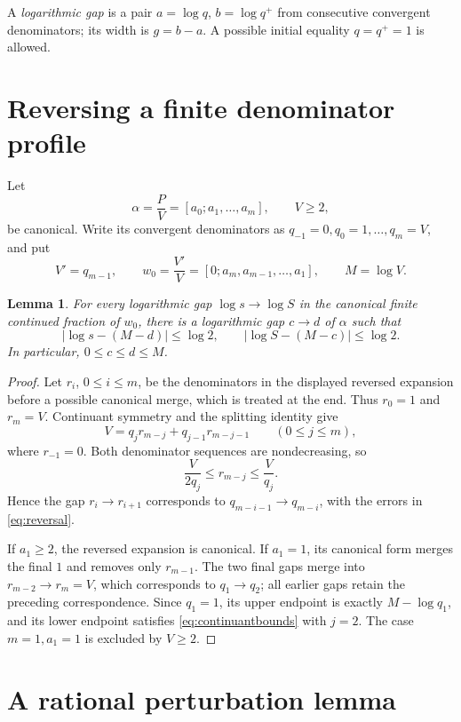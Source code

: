 \documentclass{amsart}
\newtheorem{lemma}{Lemma}[section]
\numberwithin{equation}{section}
\begin{document}
A \emph{logarithmic gap} is a pair
$a=\log q$, $b=\log q^+$ from consecutive convergent denominators;
its width is $g=b-a$. A possible initial equality $q=q^+=1$ is
allowed.

\section{Reversing a finite denominator profile}

Let
\[
\alpha=\frac PV=[a_0;a_1,\ldots,a_m],\qquad V\ge2,
\]
be canonical. Write its convergent denominators as
$q_{-1}=0,q_0=1,\ldots,q_m=V$, and put
\[
V'=q_{m-1},\qquad
w_0=\frac{V'}V=[0;a_m,a_{m-1},\ldots,a_1],\qquad M=\log V.
\]

\begin{lemma}\label{lem:reversal}
For every logarithmic gap $\log s\to\log S$ in the canonical
finite continued fraction of $w_0$, there is a logarithmic gap
$c\to d$ of $\alpha$ such that
\begin{equation}\label{eq:reversal}
|\log s-(M-d)|\le\log2,\qquad
|\log S-(M-c)|\le\log2.
\end{equation}
In particular, $0\le c\le d\le M$.
\end{lemma}

\begin{proof}
Let $r_i$, $0\le i\le m$, be the denominators in the displayed
reversed expansion before a possible canonical merge, which is treated at
the end. Thus $r_0=1$
and $r_m=V$. Continuant symmetry and the splitting identity give
\[
V=q_jr_{m-j}+q_{j-1}r_{m-j-1}\qquad(0\le j\le m),
\]
where $r_{-1}=0$. Both denominator sequences are nondecreasing, so
\begin{equation}\label{eq:continuantbounds}
\frac{V}{2q_j}\le r_{m-j}\le\frac V{q_j}.
\end{equation}
Hence the gap $r_i\to r_{i+1}$ corresponds to
$q_{m-i-1}\to q_{m-i}$, with the errors in \eqref{eq:reversal}.

If $a_1\ge2$, the reversed expansion is canonical. If $a_1=1$,
its canonical form merges the final $1$ and removes only $r_{m-1}$.
The two final gaps merge into $r_{m-2}\to r_m=V$, which corresponds to
$q_1\to q_2$; all earlier gaps retain the preceding correspondence. Since
$q_1=1$, its upper endpoint
is exactly $M-\log q_1$, and its lower endpoint satisfies
\eqref{eq:continuantbounds} with $j=2$. The case $m=1,a_1=1$
is excluded by $V\ge2$.
\end{proof}

\section{A rational perturbation lemma}
\end{document}
